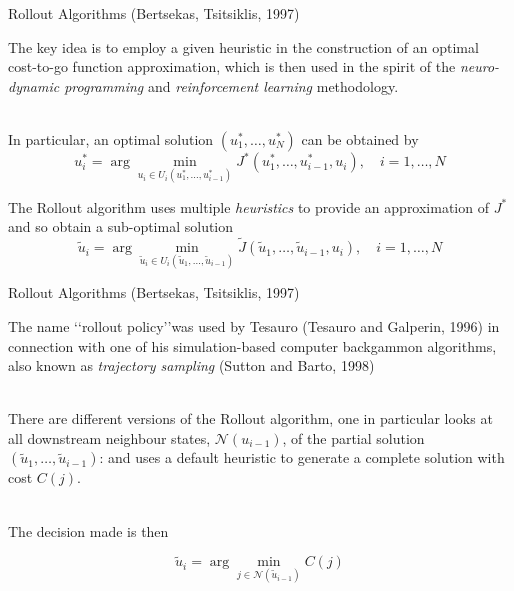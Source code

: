 \documentclass[compress]{beamer}
\begin{document}
\begin{frame}{Rollout Algorithms (Bertsekas, Tsitsiklis, 1997)}

The key idea is to employ a given heuristic in the construction of an optimal cost-to-go
function approximation, which is then used in the spirit of the \emph{neuro-dynamic programming} and 
\emph{reinforcement learning} methodology.\\
\ \\
\pause

In particular, an optimal solution $(u_1^*,\ldots,u_N^*)$ can be obtained by
$$u_i^*=\arg\min_{u_i\in U_i(u_1^*,\ldots,u_{i-1}^*)}J^*(u_1^*,\ldots,u_{i-1}^*,u_i),\quad i=1,\ldots,N$$

\pause
The Rollout algorithm uses multiple \emph{heuristics} to provide an approximation of $J^*$ and so obtain a 
sub-optimal 
solution
$$\tilde{u}_i=\arg\min_{\tilde{u}_i\in 
U_i(\tilde{u}_1,\ldots,\tilde{u}_{i-1})}\tilde{J}(\tilde{u}_1,\ldots,\tilde{u}_{i-1},u_i),\quad i=1,\ldots,N$$


\end{frame}


\begin{frame}{Rollout Algorithms (Bertsekas, Tsitsiklis, 1997)}

The name \lq\lq rollout policy\rq\rq was used by Tesauro (Tesauro and Galperin, 1996) in connection with one of his
simulation-based computer backgammon algorithms, also known as \emph{trajectory sampling} (Sutton and Barto, 1998)\\
\ \\
\pause


There are different versions of the Rollout algorithm, one in particular looks at all downstream neighbour states, 
$\mathcal{N}(u_{i-1})$, of the partial solution $(\tilde{u}_1,\ldots,\tilde{u}_{i-1})$: and uses a default heuristic 
to 
generate 
a complete solution with cost $C(j)$. \\
\ \\
\pause

The decision made is then
 
$$\tilde{u}_i=\arg\min_{j\in 
\mathcal{N}(\tilde{u}_{i-1})}C(j)$$


\end{frame}
\end{document}
